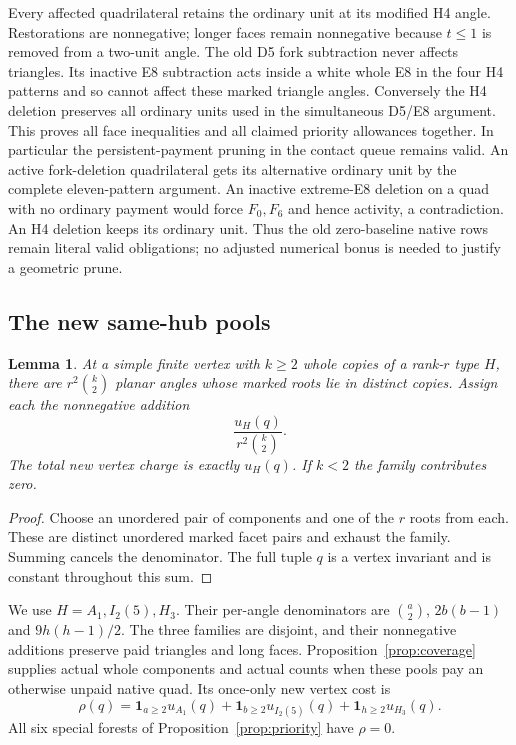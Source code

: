 \documentclass[11pt]{article}
\newtheorem{lemma}[theorem]{Lemma}
\begin{document}
Every affected quadrilateral retains the ordinary unit at its modified
H4 angle. Restorations are nonnegative; longer faces remain nonnegative
because $t\le1$ is removed from a two-unit angle. The old D5 fork
subtraction never affects triangles. Its inactive E8 subtraction acts
inside a white whole E8 in the four H4 patterns and so cannot affect
these marked triangle angles. Conversely the H4 deletion preserves all
ordinary units used in the simultaneous D5/E8 argument. This proves
all face inequalities and all claimed priority allowances together.
In particular the persistent-payment pruning in the contact queue
remains valid. An active fork-deletion quadrilateral gets its alternative
ordinary unit by the complete eleven-pattern argument. An inactive
extreme-E8 deletion on a quad with no ordinary payment would force
$F_0,F_6$ and hence activity, a contradiction. An H4 deletion keeps its
ordinary unit. Thus the old zero-baseline native rows remain literal
valid obligations; no adjusted numerical bonus is needed to justify a
geometric prune.

\subsection{The new same-hub pools}
\begin{lemma}\label{lem:pools}
At a simple finite vertex with $k\ge2$ whole copies of a rank-$r$ type
$H$, there are $r^2\binom k2$ planar angles whose marked roots lie in
distinct copies. Assign each the nonnegative addition
\[
 \frac{u_H(q)}{r^2\binom k2}.
\]
The total new vertex charge is exactly $u_H(q)$. If $k<2$ the family
contributes zero.
\end{lemma}
\begin{proof}
Choose an unordered pair of components and one of the $r$ roots from
each. These are distinct unordered marked facet pairs and exhaust the
family. Summing cancels the denominator. The full tuple $q$ is a vertex
invariant and is constant throughout this sum.
\end{proof}
We use $H=A_1,I_2(5),H_3$. Their per-angle denominators are
$\binom a2$, $2b(b-1)$ and $9h(h-1)/2$. The three families are disjoint,
and their nonnegative additions preserve paid triangles and long faces.
Proposition~\ref{prop:coverage} supplies actual whole components and actual
counts when these pools pay an otherwise unpaid native quad.
Its once-only new vertex cost is
\[
 \rho(q)=\mathbf1_{a\ge2}u_{A_1}(q)
        +\mathbf1_{b\ge2}u_{I_2(5)}(q)
        +\mathbf1_{h\ge2}u_{H_3}(q).
\]
All six special forests of Proposition~\ref{prop:priority} have $\rho=0$.
\end{document}
